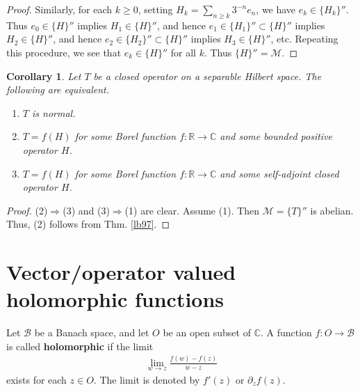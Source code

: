 \documentclass[12pt,b5paper,notitlepage]{article}
\theoremstyle{definition}
\theoremstyle{plain}
\newtheorem{co}[df]{Corollary}
\newcommand{\mc}{\mathcal}
\newcommand{\Cbb}{\mathbb C}
\newcommand{\Rbb}{\mathbb R}
\numberwithin{equation}{section}
\begin{document}
\begin{proof}
Similarly, for each $k\geq0$, setting $H_k=\sum_{n\geq k}3^{-n}e_n$, we have $e_k\in\{H_k\}''$. Thus $e_0\in\{H\}''$ implies $H_1\in\{H\}''$, and hence $e_1\in\{H_1\}''\subset\{H\}''$ implies  $H_2\in\{H\}''$, and hence $e_2\in\{H_2\}''\subset\{H\}''$ implies $H_3\in\{H\}''$, etc. Repeating this procedure, we see that $e_k\in\{H\}''$ for all $k$. Thus $\{H\}''=\mc M$.
\end{proof}





\begin{co}\label{lb98}
Let $T$ be a closed operator on a separable Hilbert space. The following are equivalent.
\begin{enumerate}
\item[(1)] $T$ is normal.
\item[(2)] $T=f(H)$ for some Borel function $f:\Rbb\rightarrow\Cbb$ and some bounded positive operator $H$.
\item[(3)] $T=f(H)$ for some Borel function $f:\Rbb\rightarrow\Cbb$ and some self-adjoint closed operator $H$.
\end{enumerate}
\end{co}


\begin{proof}
(2)$\Rightarrow$(3) and (3)$\Rightarrow$(1) are clear. Assume (1). Then $\mc M=\{T\}''$ is abelian. Thus, (2) follows from Thm. \ref{lb97}.
\end{proof}




















\appendix
\section{Vector/operator valued holomorphic functions}\label{lb55}

Let $\mc B$ be a Banach space, and let $O$ be an open subset of $\Cbb$. A function $f:O\rightarrow\mc B$ is called \textbf{holomorphic} if the limit
\begin{align*}
	\lim_{w\rightarrow z}\frac{f(w)-f(z)}{w-z}
\end{align*}
exists for each $z\in O$. The limit is denoted by $f'(z)$ or $\partial_z f(z)$.
\end{document}
